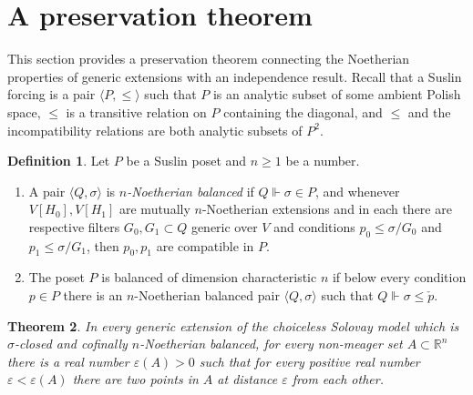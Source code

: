 \documentclass{article}
\newcommand{\gs}{\sigma}
\newcommand{\eps}{\varepsilon}
\newtheorem{theorem}{Theorem}[section]
\theoremstyle{definition}
\newtheorem{definition}[theorem]{Definition}
\begin{document}
\section{A preservation theorem}

This section provides a preservation theorem connecting the Noetherian properties of generic extensions with an independence result. Recall that a Suslin forcing is a pair $\langle P, \leq\rangle$ such that $P$ is an analytic subset of some ambient Polish space, $\leq$ is a transitive relation on $P$ containing the diagonal, and $\leq$ and the incompatibility relations are both analytic subsets of $P^2$.

\begin{definition}
Let $P$ be a Suslin poset and $n\geq 1$ be a number.

\begin{enumerate}
\item A pair $\langle Q, \gs\rangle$ is $n$\emph{-Noetherian balanced} if $Q\Vdash\gs\in P$, and whenever $V[H_0], V[H_1]$ are mutually $n$-Noetherian extensions and in each there are respective filters $G_0, G_1\subset Q$ generic over $V$ and conditions $p_0\leq \gs/G_0$ and $p_1\leq\gs/G_1$, then $p_0, p_1$ are compatible in $P$. 
\item The poset $P$ is balanced of dimension characteristic $n$ if below every condition $p\in P$ there is an $n$-Noetherian balanced pair $\langle Q, \gs\rangle$ such that $Q\Vdash\gs\leq\check p$.
\end{enumerate}
\end{definition}

\begin{theorem}
\label{preservationtheorem}
In every generic extension of the choiceless Solovay model which is $\gs$-closed and cofinally $n$-Noetherian balanced, for every non-meager set $A\subset\mathbb{R}^n$ there is a real number $\eps(A)>0$ such that for every positive real number $\eps<\eps(A)$ there are two points in $A$ at distance $\eps$ from each other.
\end{theorem}
\end{document}
